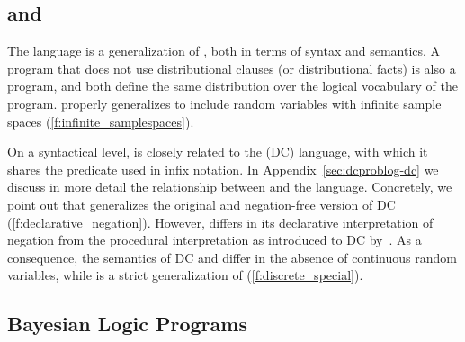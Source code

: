 \subsection{\problogsty and \dcsty}

The \dcproblogsty language is a generalization of \problogsty, both in terms of syntax and semantics. A \dcproblogsty program that does not use distributional clauses (or distributional facts) is also a \problogsty program, and both define the same distribution over the logical vocabulary of the program. \dcproblogsty properly generalizes \problogsty to include random variables with infinite sample spaces (\ref{f:infinite_samplespaces}). 

On a syntactical level, \dcproblogsty is closely related to the \dcsty (DC) language, with which it shares the   predicate used in infix notation. 
In Appendix~\ref{sec:dcproblog-dc} we discuss in more detail the relationship between \dcproblogsty and the \dcsty language. Concretely, we point out that 
\dcproblogsty generalizes the original and negation-free version of DC~\citep{gutmann2011magic} (\ref{f:declarative_negation}).
However, \dcproblogsty differs in its declarative interpretation of negation from the procedural interpretation as introduced to DC by~\citet{nitti2016probabilistic}.
As a consequence, the semantics of DC and \problogsty differ in the absence of continuous random variables, while \dcproblogsty is a strict generalization of \problogsty (\ref{f:discrete_special}).



\subsection{Bayesian Logic Programs}
\label{sec:blp}




